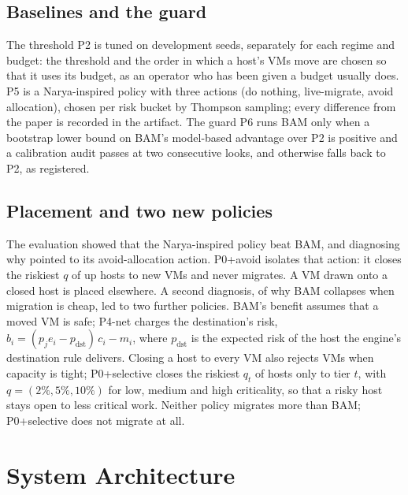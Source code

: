 \documentclass[pdflatex,sn-mathphys-num,iicol]{sn-jnl}
\theoremstyle{thmstyleone}%
\theoremstyle{thmstylethree}%
\begin{document}
\subsection{Baselines and the guard}\label{sec:baselines}

The threshold P2 is tuned on development seeds, separately for each regime and budget: the
threshold and the order in which a host's VMs move are chosen so that it uses its budget, as an
operator who has been given a budget usually does. P5 is a Narya-inspired policy with three
actions (do nothing, live-migrate, avoid allocation), chosen per risk bucket by Thompson sampling;
every difference from the paper is recorded in the artifact. The guard P6 runs BAM only when a
bootstrap lower bound on BAM's model-based advantage over P2 is positive and a calibration audit
passes at two consecutive looks, and otherwise falls back to P2, as registered.

\subsection{Placement and two new policies}\label{sec:new}

The evaluation showed that the Narya-inspired policy beat BAM, and diagnosing why pointed to its
avoid-allocation action. P0+avoid isolates that action: it closes the riskiest $q$ of up hosts to
new VMs and never migrates. A VM drawn onto a closed host is placed elsewhere. A second diagnosis,
of why BAM collapses when migration is cheap, led to two further policies. BAM's benefit assumes
that a moved VM is safe; P4-net charges the destination's risk,
$b_i = (p_j e_i - p_{\mathrm{dst}})\,c_i - m_i$, where $p_{\mathrm{dst}}$ is the expected risk of
the host the engine's destination rule delivers. Closing a host to every VM also rejects VMs when
capacity is tight; P0+selective closes the riskiest $q_t$ of hosts only to tier $t$, with
$q = (2\%, 5\%, 10\%)$ for low, medium and high criticality, so that a risky host stays open to
less critical work. Neither policy migrates more than BAM; P0+selective does not migrate at all.

\section{System Architecture}\label{sec:arch}
\end{document}
